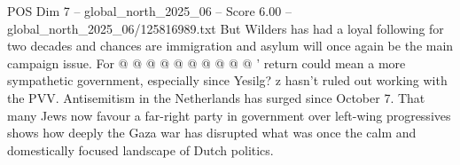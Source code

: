 \begin{textsample}{POS Dim 7 – global\_north\_2025\_06 – Score 6.00 – global\_north\_2025\_06/125816989.txt}
But Wilders has had a loyal following for two decades and chances are immigration and asylum will once again be the main campaign issue.
For @ @ @ @ @ @ @ @ @ @ ' return could mean a more sympathetic government, especially since Yesilg? z hasn't ruled out working with the PVV.
Antisemitism in the Netherlands has surged since October 7.
That many Jews now favour a far-right party in government over left-wing progressives shows how deeply the Gaza war has disrupted what was once the calm and domestically focused landscape of Dutch politics.

\end{textsample}
